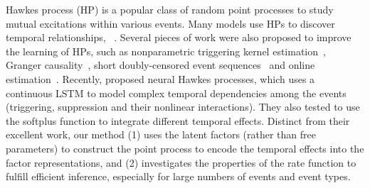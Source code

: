 Hawkes process (HP) is a popular class of random point processes to study mutual excitations within various events. Many models use HPs to discover temporal relationships, \eg~\citep{blundell2012modelling,tan2016content,linderman2014discovering,du2015dirichlet,he2015hawkestopic,wang2017predicting}. Several pieces of work were also proposed to improve the learning of  HPs, such as nonparametric triggering kernel estimation~\citep{zhou2013learning}, Granger causality~\citep{xu2016learning},  short doubly-censored event sequences~\citep{xu2017learning} and online estimation~\citep{yang2017online}.  Recently, \citet{mei2017neural} proposed neural Hawkes processes, which uses a continuous LSTM to  model complex temporal dependencies among the events (\eg triggering, suppression and their nonlinear interactions). They also tested to use the softplus function to integrate different temporal effects. Distinct from their excellent work, our method (1) uses the latent factors (rather than free parameters) to construct the point process to encode the temporal effects into the factor representations, and (2) investigates the properties of the rate function to fulfill efficient inference, especially for large numbers of events and event types.

